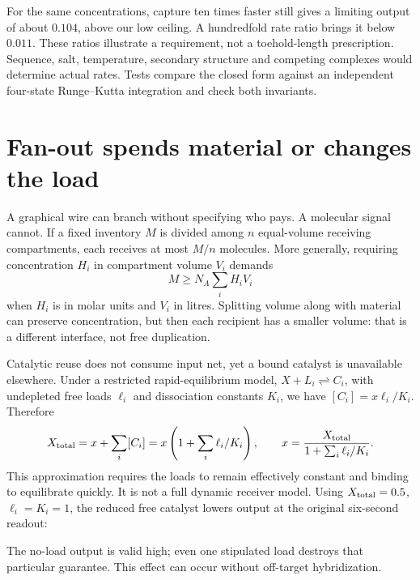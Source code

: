 \begin{center}\end{center}

For the same concentrations, capture ten times faster still gives a limiting
output of about $0.104$, above our low ceiling. A hundredfold rate ratio brings
it below $0.011$. These ratios illustrate a requirement, not a toehold-length
prescription. Sequence, salt, temperature, secondary structure and competing
complexes would determine actual rates. Tests compare the closed form against
an independent four-state Runge--Kutta integration and check both invariants.

\section{Fan-out spends material or changes the load}

A graphical wire can branch without specifying who pays. A molecular signal
cannot. If a fixed inventory $M$ is divided among $n$ equal-volume receiving
compartments, each receives at most $M/n$ molecules. More generally, requiring
concentration $H_i$ in compartment volume $V_i$ demands
\begin{equation}
 M\geq N_A\sum_i H_iV_i
\end{equation}
when $H_i$ is in molar units and $V_i$ in litres. Splitting volume along with
material can preserve concentration, but then each recipient has a smaller
volume: that is a different interface, not free duplication.


Catalytic reuse does not consume input net, yet a bound catalyst is unavailable
elsewhere. Under a restricted rapid-equilibrium model,
$X+L_i\rightleftharpoons C_i$, with undepleted free loads $\ell_i$ and
dissociation constants $K_i$, we have $[C_i]=x\ell_i/K_i$. Therefore
\begin{equation}
 X_{\rm total}=x+\sum_i[C_i]
 =x\left(1+\sum_i\ell_i/K_i\right),\qquad
 x=\frac{X_{\rm total}}{1+\sum_i\ell_i/K_i}.
 \label{eq:load}
\end{equation}
This approximation requires the loads to remain effectively constant and
binding to equilibrate quickly. It is not a full dynamic receiver model.
Using $X_{\rm total}=0.5$, $\ell_i=K_i=1$, the reduced free catalyst lowers
output at the original six-second readout:
\begin{center}\end{center}
The no-load output is valid high; even one stipulated load destroys that
particular guarantee. This effect can occur without off-target hybridization.

